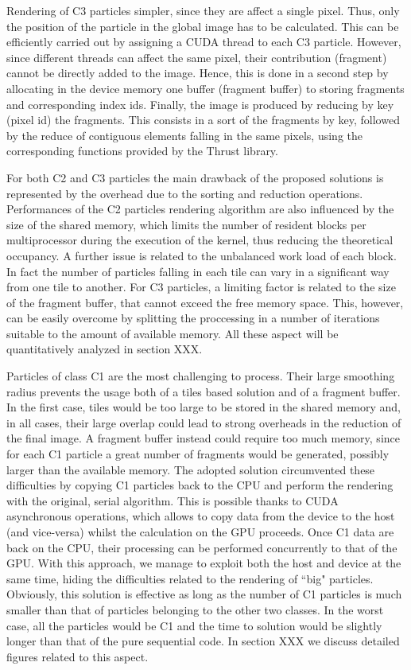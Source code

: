 \documentclass[11pt]{article}
\begin{document}
Rendering of C3 particles simpler, since they are affect a single pixel. 
Thus, only the position of the particle in the global image has to be calculated.
This can be efficiently carried out by assigning a CUDA thread to each C3 particle. 
However, since different threads can affect the same pixel, their contribution (fragment) 
cannot be directly added to the image. Hence, this is done in a second step by allocating 
in the device memory one buffer (fragment buffer) to storing fragments and
corresponding index ids. Finally, the image is produced by reducing by key (pixel id) the 
fragments. This consists in a sort of the fragments by key, followed by the reduce of 
contiguous elements falling in the same pixels, using the corresponding 
functions provided by the Thrust library.

For both C2 and C3 particles the main drawback of the proposed solutions 
is represented by the overhead due to the sorting and reduction operations.
Performances of the C2 particles rendering algorithm are also influenced 
by the size of the shared memory, which limits the number of resident blocks
per multiprocessor during the execution of the kernel, thus reducing the theoretical
occupancy. A further issue is related to the
unbalanced work load of each block. In fact the number of particles falling
in each tile can vary in a significant way from one tile to another. 
For C3 particles, a limiting factor is related to the size of the fragment buffer,
that cannot exceed the free memory space. This, however, can be 
easily overcome by splitting the proccessing in a number of iterations suitable 
to the amount of available memory.  
All these aspect will be quantitatively analyzed in section XXX.

Particles of class C1 are the most challenging to process. Their large smoothing 
radius prevents the usage both of a tiles based solution and of a fragment buffer.
In the first case, tiles would be too large to be stored in the shared memory
and, in all cases, their large overlap could lead to strong overheads in the reduction of the 
final image. A fragment buffer instead could require too much memory, since 
for each C1 particle a great number of fragments would be generated, possibly
larger than the available memory. The adopted solution circumvented these 
difficulties by copying C1 particles back to the CPU and perform the rendering 
with the original, serial algorithm. This is possible thanks to CUDA asynchronous
operations, which allows to copy data from the device to the host (and vice-versa)
whilst the calculation on the GPU proceeds. Once C1 data are back on the CPU, 
their processing can be performed concurrently to that of the GPU.  
With this approach, we manage to exploit both the host and device
at the same time, hiding the difficulties related to the rendering of ``big"
particles. Obviously, this solution is effective as long as the number of C1 particles 
is much smaller than that of particles belonging to the other two classes. 
In the worst case, all the particles would be C1 and the time to solution would be slightly 
longer than that of the pure sequential code. In section XXX we discuss
detailed figures related to this aspect.
\end{document}
